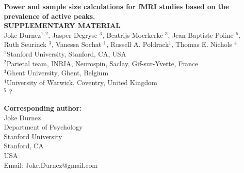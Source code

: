 \begin{titlepage}
\vspace*{0cm}
{\sffamily
\vfill
\begin{center}

{\Large \bfseries Power and sample size calculations for fMRI studies based on the prevalence of active peaks.}\\[1cm]
{\huge \bfseries SUPPLEMENTARY MATERIAL}\\[1cm]

{\large Joke Durnez$^{1,2}$, Jasper Degryse $^3$, Beatrijs Moerkerke $^3$, Jean-Baptiste Poline $^5$, Ruth Seurinck $^3$, Vanessa Sochat $^1$, Russell A. Poldrack$^1$, Thomas E. Nichols $^4$}\\
$^1$Stanford University, Stanford, CA, USA \\
$^2$Parietal team, INRIA, Neurospin, Saclay, Gif-sur-Yvette, France \\
$^3$Ghent University, Ghent, Belgium\\
$^4$University of Warwick, Coventry, United Kingdom \\
$^5$ ?
\end{center}


\vfill

{\bfseries Corresponding author:}\\
Joke Durnez\\
Department of Psychology\\
Stanford University\\
Stanford, CA\\
USA\\
Email: Joke.Durnez@gmail.com
}\end{titlepage}
